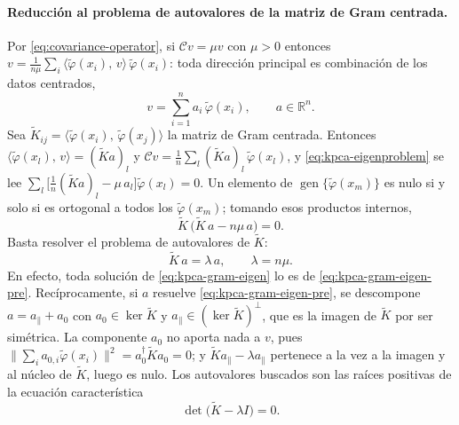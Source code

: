 \documentclass[11pt,a4paper]{article}
\newcommand{\R}{\mathbb{R}}
\newcommand{\dg}{\dagger}                         %
\newcommand{\Kc}{\widetilde{K}}                   %
\newcommand{\inner}[2]{\langle #1,\, #2\rangle}
\newcommand{\norm}[1]{\lVert #1\rVert}
\DeclareMathOperator{\gen}{gen}
\theoremstyle{plain}
\theoremstyle{definition}
\theoremstyle{remark}
\numberwithin{equation}{section}
\begin{document}
\paragraph{Reducción al problema de autovalores de la matriz de Gram centrada.} Por
\eqref{eq:covariance-operator}, si $\mathcal Cv=\mu v$ con $\mu>0$ entonces
$v=\frac1{n\mu}\sum_i\inner{\tilde\varphi(x_i)}{v}\,\tilde\varphi(x_i)$: toda dirección
principal es combinación de los datos centrados,
\begin{equation}\label{eq:kpca-span}
  v=\sum_{i=1}^na_i\,\tilde\varphi(x_i),\qquad a\in\R^n .
\end{equation}
Sea $\Kc_{ij}=\inner{\tilde\varphi(x_i)}{\tilde\varphi(x_j)}$ la matriz de Gram centrada.
Entonces $\inner{\tilde\varphi(x_l)}{v}=(\Kc a)_l$ y
$\mathcal Cv=\frac1n\sum_l(\Kc a)_l\,\tilde\varphi(x_l)$, y \eqref{eq:kpca-eigenproblem} se
lee $\sum_l\bigl[\frac1n(\Kc a)_l-\mu\,a_l\bigr]\tilde\varphi(x_l)=0$. Un elemento de
$\gen\{\tilde\varphi(x_m)\}$ es nulo si y solo si es ortogonal a todos los
$\tilde\varphi(x_m)$; tomando esos productos internos,
\begin{equation}\label{eq:kpca-gram-eigen-pre}
  \Kc\,\bigl(\Kc\,a-n\mu\,a\bigr)=0 .
\end{equation}
Basta resolver el problema de autovalores de $\Kc$:
\begin{equation}\label{eq:kpca-gram-eigen}
  \Kc\,a=\lambda\,a,\qquad\lambda=n\mu .
\end{equation}
En efecto, toda solución de \eqref{eq:kpca-gram-eigen} lo es de
\eqref{eq:kpca-gram-eigen-pre}. Recíprocamente, si $a$ resuelve
\eqref{eq:kpca-gram-eigen-pre}, se descompone $a=a_\parallel+a_0$ con $a_0\in\ker\Kc$ y
$a_\parallel\in(\ker\Kc)^{\perp}$, que es la imagen de $\Kc$ por ser simétrica. La
componente $a_0$ no aporta nada a $v$, pues
$\norm{\sum_ia_{0,i}\tilde\varphi(x_i)}^2=a_0^{\dg}\Kc a_0=0$; y
$\Kc a_\parallel-\lambda a_\parallel$ pertenece a la vez a la imagen y al núcleo de $\Kc$,
luego es nulo. Los autovalores buscados son las raíces positivas de la ecuación
característica
\begin{equation}\label{eq:kpca-char-eq}
  \det\bigl(\Kc-\lambda I\bigr)=0 .
\end{equation}
\end{document}
